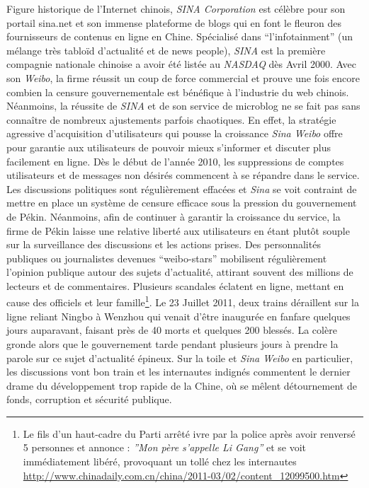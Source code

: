 Figure historique de l’Internet chinois, \textit{SINA Corporation} est célèbre pour son portail sina.net et son immense plateforme de blogs qui en font le fleuron des fournisseurs de contenus en ligne en Chine. Spécialisé dans “l’infotainment” (un mélange très tabloïd d’actualité et de news people), \textit{SINA} est la première compagnie nationale chinoise a avoir été listée au \textit{NASDAQ} dès Avril 2000. Avec son \textit{Weibo}, la firme réussit un coup de force commercial et prouve une fois encore combien la censure gouvernementale est bénéfique à l’industrie du web chinois. Néanmoins, la réussite de \textit{SINA} et de son service de microblog ne se fait pas sans connaître de nombreux ajustements parfois chaotiques. En effet, la stratégie agressive d’acquisition d’utilisateurs qui pousse la croissance \textit{Sina Weibo} offre pour garantie aux utilisateurs de pouvoir mieux s’informer et discuter plus facilement en ligne. Dès le début de l’année 2010, les suppressions de comptes utilisateurs et de messages non désirés commencent à se répandre dans le service. Les discussions politiques sont régulièrement effacées et \textit{Sina} se voit contraint de mettre en place un système de censure efficace sous la pression du gouvernement de Pékin. Néanmoins, afin de continuer à garantir la croissance du service, la firme de Pékin laisse une relative liberté aux utilisateurs en étant plutôt souple sur la surveillance des discussions et les actions prises. Des personnalités publiques ou journalistes devenues “weibo-stars” mobilisent régulièrement l’opinion publique autour des sujets d’actualité, attirant souvent des millions de lecteurs et de commentaires. Plusieurs scandales éclatent en ligne, mettant en cause des officiels et leur famille\footnote{Le fils d’un haut-cadre du Parti arrêté ivre par la police après avoir renversé 5 personnes et annonce : \textit{”Mon père s’appelle Li Gang”} et se voit immédiatement libéré, provoquant un tollé chez les internautes \url{http://www.chinadaily.com.cn/china/2011-03/02/content_12099500.htm}}. Le 23 Juillet 2011, deux trains déraillent sur la ligne reliant Ningbo à Wenzhou qui venait d’être inaugurée en fanfare quelques jours auparavant, faisant près de 40 morts et quelques 200 blessés. La colère gronde alors que le gouvernement tarde pendant plusieurs jours à prendre la parole sur ce sujet d’actualité épineux. Sur la toile et \textit{Sina Weibo} en particulier, les discussions vont bon train et les internautes indignés commentent le dernier drame du développement trop rapide de la Chine, où se mêlent détournement de fonds, corruption et sécurité publique. 


